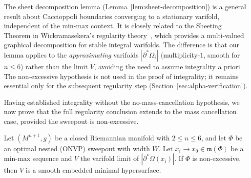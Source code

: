 \begin{remark}
The sheet decomposition lemma (Lemma~\ref{lem:sheet-decomposition}) is a general result about Caccioppoli boundaries converging to a stationary varifold, independent of the min-max context. It is closely related to the Sheeting Theorem in Wickramasekera's regularity theory~\cite{Wic14}, which provides a multi-valued graphical decomposition for stable integral varifolds. The difference is that our lemma applies to the \emph{approximating} varifolds $|\partial^*\Omega_i|$ (multiplicity-$1$, smooth for $n \leq 6$) rather than the limit $V$, avoiding the need to assume integrality a priori. The non-excessive hypothesis is not used in the proof of integrality; it remains essential only for the subsequent regularity step (Section~\ref{sec:alpha-verification}).
\end{remark}

Having established integrality without the no-mass-cancellation hypothesis, we now prove that the full regularity conclusion extends to the mass cancellation case, provided the sweepout is non-excessive.

\begin{proposition}\label{prop:regularity-mass-cancellation}
Let $(M^{n+1}, g)$ be a closed Riemannian manifold with $2 \leq n \leq 6$, and let $\Phi$ be an optimal nested \textup{(}ONVP\textup{)} sweepout with width $W$. Let $x_i \to x_0 \in \mathfrak{m}(\Phi)$ be a min-max sequence and $V$ the varifold limit of $|\partial^*\Omega(x_i)|$. If $\Phi$ is non-excessive, then $V$ is a smooth embedded minimal hypersurface.
\end{proposition}

